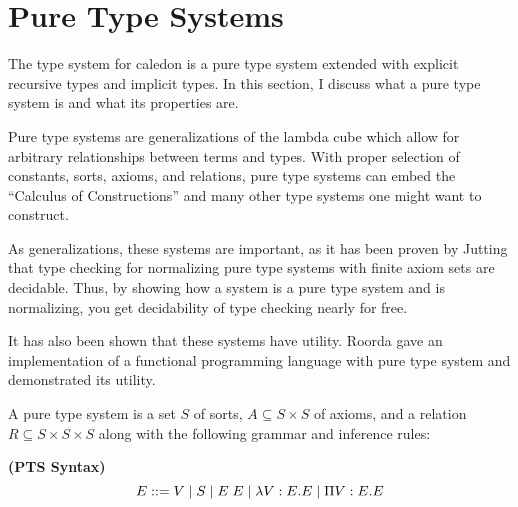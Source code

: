 \section{Pure Type Systems}

The type system for caledon is a pure type system \citep{mckinna1993pure} 
extended with explicit recursive types and implicit types.  In this section,
I discuss what a pure type system is and what its properties are.

Pure type systems are generalizations of the lambda cube
\citep{barendregt1991introduction} which allow for arbitrary 
relationships between terms and types.
With proper selection of constants, sorts, axioms, and relations,
pure type systems can embed the ``Calculus of Constructions'' \citep{coquand1986calculus}
and many other type systems one might want to construct.

As generalizations, these systems are important, as it has been proven by Jutting \citep{jutting1993typing} that 
type checking for normalizing pure type systems with finite axiom sets are decidable.  Thus, by showing how a system is a pure type system and is normalizing, 
you get decidability of type checking nearly for free.

It has also been shown that these systems have utility.  
Roorda \citep{roorda2001pure} gave an implementation of a functional programming language with 
pure type system and demonstrated its utility.

A pure type system is a set $S$ of sorts, 
$A\subseteq S \times S$ of axioms, and a relation 
$R \subseteq S \times S \times S$ along with the following grammar and inference rules:

\begin{definition}
\textbf{(PTS Syntax)}
\[ 
E ::=  V 
 \; | \; S 
 \; | \; E\;E 
 \; | \; \lambda V : E . E 
 \; | \; \Pi V : E . E 
\]

\label{pt:syntax}
\end{definition}

